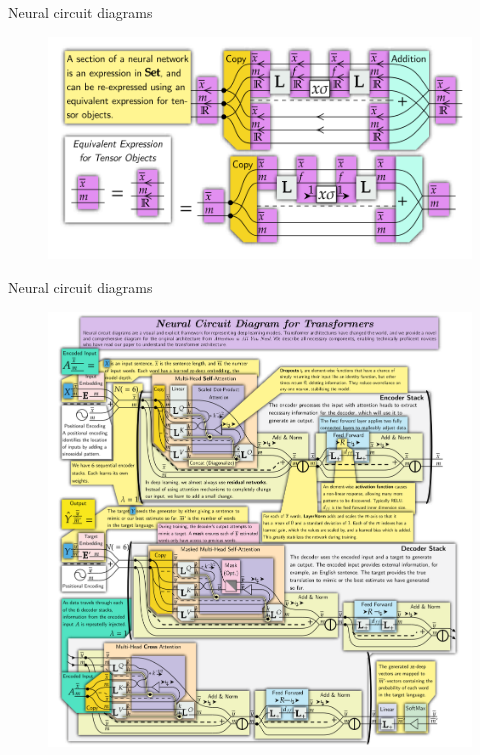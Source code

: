 \documentclass{beamer}
\begin{document}
\begin{frame}{Neural circuit diagrams}
    \begin{figure}
        \begin{center}
            \includegraphics[width=\textwidth]{figures/from_fsd_to_ncd.png}
            \caption*{\cite{abbott2024functor}}
        \end{center}
    \end{figure}
\end{frame}

\begin{frame}{Neural circuit diagrams}
    \begin{figure}
        \begin{center}
            \includegraphics[width=\textwidth]{figures/transformer_ncd.png}
            \caption*{\cite{abbott2023robust}}
        \end{center}
    \end{figure}
\end{frame}
\end{document}
